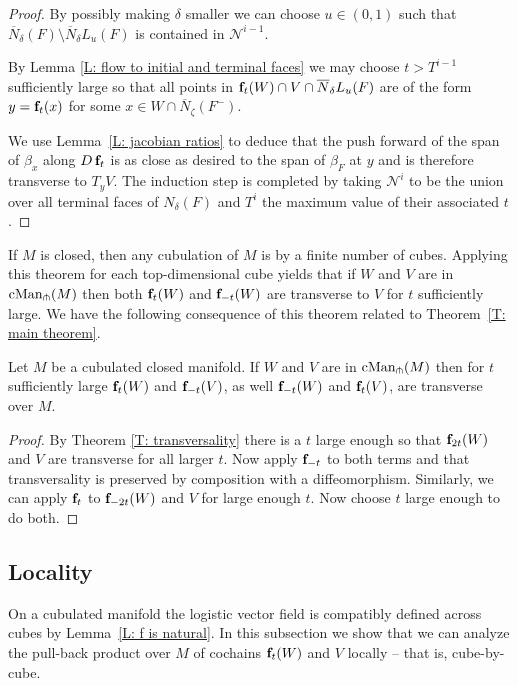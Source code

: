 \begin{proof}
	By possibly making $\delta$ smaller we can choose $u \in (0, 1)$ such that $\overline N_\delta(F) \setminus \overline N_\delta L_u(F)$ is contained in $\mathcal N^{i-1}$.
	
	By Lemma \ref{L: flow to initial and terminal faces} we may choose $t > T^{i-1}$ sufficiently large so that all points in $\mathbf{f}_t(W) \cap V \cap \overline N_\delta L_u(F)$ are of the form $y = \mathbf{f}_t(x)$ for some $x \in W \cap \overline N_\zeta(F^-)$.
	
	We use Lemma~\ref{L: jacobian ratios} to deduce that the push forward of the span of $\beta_x$ along $D\,\mathbf{f}_t$ is as close as desired to the span of $\beta_F$ at $y$ and is therefore transverse to $T_y V$.
	The induction step is completed by taking $\mathcal N^i$ to be the union over all terminal faces of $N_\delta(F)$ and $T^i$ the maximum value of their associated $t$.
\end{proof}

If $M$ is closed, then any cubulation of $M$ is by a finite number of cubes.
Applying this theorem for each top-dimensional cube yields that if $W$ and $V$ are in $\mathrm{cMan}_\pitchfork(M)$ then both $\mathbf{f}_t(W)$ and $\mathbf{f}_{-t}(W)$ are transverse to $V$ for $t$ sufficiently large.
We have the following consequence of this theorem related to Theorem~\ref{T: main theorem}.

\begin{corollary} \label{C: transversality}
	Let $M$ be a cubulated closed manifold.
	If $W$ and $V$ are in $\mathrm{cMan}_\pitchfork(M)$ then for $t$ sufficiently large  $\mathbf{f}_t(W)$ and $\mathbf{f}_{-t}(V)$, as well $\mathbf{f}_{-t}(W)$ and $\mathbf{f}_t(V)$, are transverse over $M$.
\end{corollary}

\begin{proof}
By Theorem \ref{T: transversality} there is a $t$ large enough so that $\mathbf{f}_{2t}(W)$ and $V$ are transverse for all larger $t$. Now apply $\mathbf{f}_{-t}$ to both terms and that transversality is preserved by composition with a diffeomorphism. Similarly, we can apply $\mathbf{f}_t$ to $\mathbf{f}_{-2t}(W)$ and $V$ for large enough $t$. Now choose $t$ large enough to do both. 
\end{proof}

\subsection{Locality}

On a cubulated manifold the logistic vector field is compatibly defined across cubes by Lemma~\ref{L: f is natural}.
In this subsection we show that we can analyze the pull-back product over $M$ of cochains $\mathbf{f}_t(W)$ and $V$ locally -- that is, cube-by-cube.

